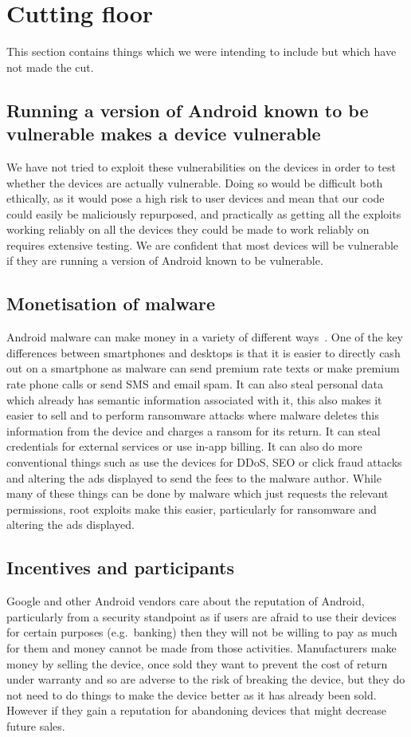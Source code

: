 \section{Cutting floor}

This section contains things which we were intending to include but which have not made the cut.

\subsection{Running a version of Android known to be vulnerable makes a device vulnerable}
We have not tried to exploit these vulnerabilities on the devices in order to test whether the devices are actually vulnerable.
Doing so would be difficult both ethically, as it would pose a high risk to user devices and mean that our code could easily be maliciously repurposed, and practically as getting all the exploits working reliably on all the devices they could be made to work reliably on requires extensive testing.
We are confident that most devices will be vulnerable if they are running a version of Android known to be vulnerable. 

\subsection{Monetisation of malware}
Android malware can make money in a variety of different ways~\cite{Felt2011}.
One of the key differences between smartphones and desktops is that it is easier to directly cash out on a smartphone as malware can send premium rate texts or make premium rate phone calls or send SMS and email spam.
It can also steal personal data which already has semantic information associated with it, this also makes it easier to sell and to perform ransomware attacks where malware deletes this information from the device and charges a ransom for its return.
It can steal credentials for external services or use in-app billing.
It can also do more conventional things such as use the devices for DDoS, SEO or click fraud attacks and altering the ads displayed to send the fees to the malware author.
While many of these things can be done by malware which just requests the relevant permissions, root exploits make this easier, particularly for ransomware and altering the ads displayed.

\subsection{Incentives and participants}
\label{sec:economics}
Google and other Android vendors care about the reputation of Android, particularly from a security standpoint as if users are afraid to use their devices for certain purposes (e.g.\ banking) then they will not be willing to pay as much for them and money cannot be made from those activities.
Manufacturers make money by selling the device, once sold they want to prevent the cost of return under warranty and so are adverse to the risk of breaking the device, but they do not need to do things to make the device better as it has already been sold.
However if they gain a reputation for abandoning devices that might decrease future sales.

